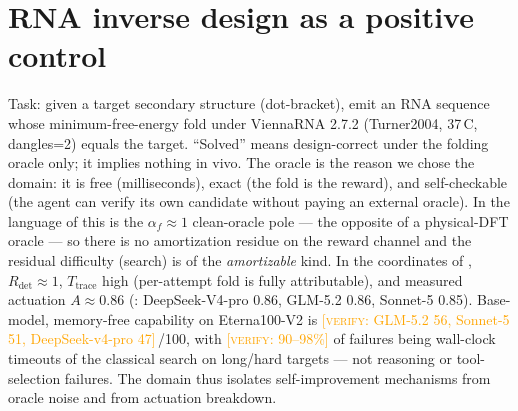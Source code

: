 \documentclass[11pt]{article}
\newcommand{\Rdet}{R_{\mathrm{det}}}
\newcommand{\Ttrace}{T_{\mathrm{trace}}}
\newcommand{\verify}[1]{\textcolor{orange}{[\textsc{verify}: #1]}}
\begin{document}
\section{RNA inverse design as a positive control}\label{sec:control}
Task: given a target secondary structure (dot-bracket), emit an RNA sequence whose minimum-free-energy
fold under ViennaRNA 2.7.2 (Turner2004, 37\,\textdegree C, dangles=2) equals the target. ``Solved''
means design-correct under the folding oracle only; it implies nothing in vivo. The oracle is the
reason we chose the domain: it is free (milliseconds), exact (the fold is the reward), and
self-checkable (the agent can verify its own candidate without paying an external oracle). In the
language of \citet{oracleresidue} this is the $\alpha_f\!\approx\!1$ clean-oracle pole --- the
opposite of a physical-DFT oracle --- so there is no amortization residue on the reward channel and
the residual difficulty (search) is of the \emph{amortizable} kind. In the coordinates of
\citet{determinismmanifold}, $\Rdet\approx1$, $\Ttrace$ high (per-attempt fold is fully attributable),
and measured actuation $A\approx0.86$ (\citealp{actuation}: DeepSeek-V4-pro 0.86, GLM-5.2 0.86,
Sonnet-5 0.85). Base-model, memory-free capability on Eterna100-V2 is \verify{GLM-5.2 56, Sonnet-5
51, DeepSeek-v4-pro 47}\,/100, with \verify{90--98\%} of failures being wall-clock timeouts of the
classical search on long/hard targets --- not reasoning or tool-selection failures. The domain thus
isolates self-improvement mechanisms from oracle noise and from actuation breakdown.
\end{document}
